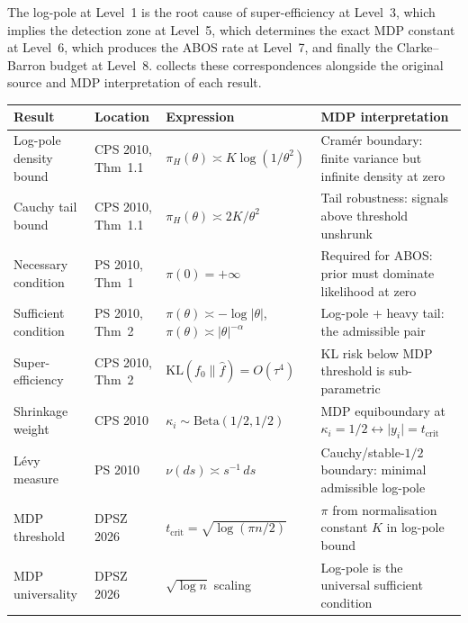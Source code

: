 \documentclass[12pt]{article}
\newcommand{\KL}{\mathrm{KL}}
\newcommand{\abs}[1]{\lvert #1 \rvert}
\newcommand{\piH}{\pi_H}
\newcommand{\tcrit}{t_{\mathrm{crit}}}
\begin{document}
The log-pole at Level~1 is the root cause of super-efficiency at Level~3, which implies the detection zone at Level~5, which determines the exact MDP constant at Level~6, which produces the ABOS rate at Level~7, and finally the Clarke--Barron budget at Level~8.  collects these correspondences alongside the original source and MDP interpretation of each result.

\begin{table}[H]
\centering
\small
\renewcommand{\arraystretch}{1.3}
\begin{tabular}{@{}p{2.3cm}p{2.2cm}p{4.2cm}p{4.5cm}@{}}
\toprule
\textbf{Result} & \textbf{Location} & \textbf{Expression} & \textbf{MDP interpretation} \\
\midrule
Log-pole density bound &
CPS 2010, Thm~1.1 &
$\piH(\theta) \asymp K\log(1/\theta^2)$ &
Cram\'er boundary: finite variance but infinite density at zero \\

Cauchy tail bound &
CPS 2010, Thm~1.1 &
$\piH(\theta) \asymp 2K/\theta^2$ &
Tail robustness: signals above threshold unshrunk \\

Necessary condition &
PS 2010, Thm~1 &
$\pi(0) = +\infty$ &
Required for ABOS: prior must dominate likelihood at zero \\

Sufficient condition &
PS 2010, Thm~2 &
$\pi(\theta) \asymp -\log\abs{\theta}$, $\pi(\theta) \asymp \abs{\theta}^{-\alpha}$ &
Log-pole + heavy tail: the admissible pair \\

Super-efficiency &
CPS 2010, Thm~2 &
$\KL(f_0\|\hat{f}) = O(\tau^4)$ &
KL risk below MDP threshold is sub-parametric \\

Shrinkage weight &
CPS 2010 &
$\kappa_i \sim \mathrm{Beta}(1/2,1/2)$ &
MDP equiboundary at $\kappa_i = 1/2 \leftrightarrow \abs{y_i} = \tcrit$ \\

L\'evy measure &
PS 2010 &
$\nu(ds) \asymp s^{-1}\,ds$ &
Cauchy/stable-$1/2$ boundary: minimal admissible log-pole \\

MDP threshold &
DPSZ 2026 &
$\tcrit = \sqrt{\log(\pi n/2)}$ &
$\pi$ from normalisation constant $K$ in log-pole bound \\

MDP universality &
DPSZ 2026 &
$\sqrt{\log n}$ scaling &
Log-pole is the universal sufficient condition \\


\end{tabular}
\end{table}
\end{document}

